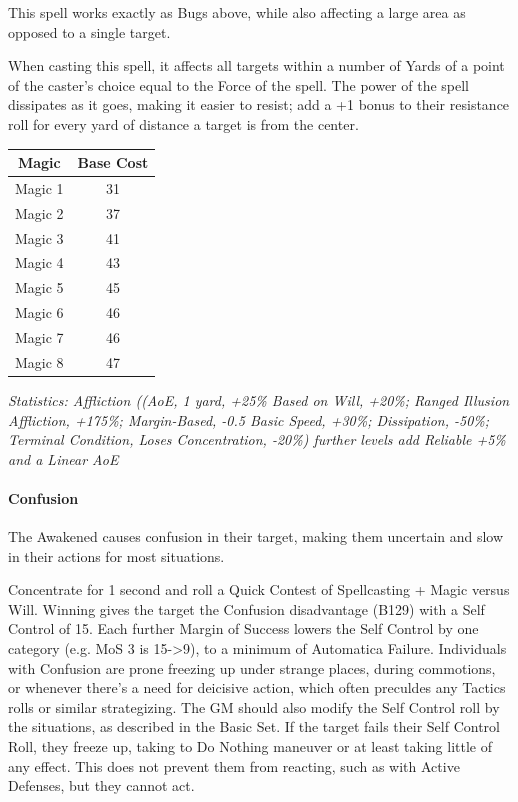 \begin{multicols*}{3}
	This spell works exactly as Bugs above, while also affecting a large area as opposed to a single target.
	
	When casting this spell, it affects all targets within a number of Yards of a point of the caster's choice equal to the Force of the spell. The power of the spell dissipates as it goes, making it easier to resist; add a +1 bonus to their resistance roll for every yard of distance a target is from the center.
	
	\begin{center}
		\begin{tabular}{|c|c|}
			\hline
			Magic & Base Cost \\
			\hline
			\hline
			Magic 1 & 31 \\
			Magic 2 & 37 \\
			Magic 3 & 41 \\
			Magic 4 & 43 \\
			Magic 5 & 45 \\
			Magic 6 & 46 \\
			Magic 7 & 46 \\
			Magic 8 & 47 \\
			\hline
		\end{tabular}
	\end{center}
	
	\textcolor{OliveGreen}{\textit{Statistics: Affliction ((AoE, 1 yard, +25\% Based on Will, +20\%; Ranged Illusion Affliction, +175\%; Margin-Based, -0.5 Basic Speed, +30\%; Dissipation, -50\%; Terminal Condition, Loses Concentration, -20\%)  further levels add Reliable +5\% and a Linear AoE}}
	
	\paragraph{Confusion}
	
	The Awakened causes confusion in their target, making them uncertain and slow in their actions for most situations.
	
	Concentrate for 1 second and roll a Quick Contest of Spellcasting + Magic versus Will. Winning gives the target the Confusion disadvantage (B129) with a Self Control of 15. Each further Margin of Success lowers the Self Control by one category (e.g. MoS 3 is 15->9), to a minimum of Automatica Failure. Individuals with Confusion are prone freezing up under strange places, during commotions, or whenever there's a need for deicisive action, which often preculdes any Tactics rolls or similar strategizing. The GM should also modify the Self Control roll by the situations, as described in the Basic Set. If the target fails their Self Control Roll, they freeze up, taking to Do Nothing maneuver or at least taking little of any effect. This does not prevent them from reacting, such as with Active Defenses, but they cannot act.
	

\end{multicols*}
